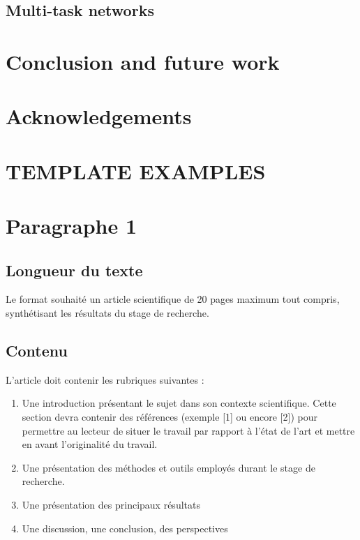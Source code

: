 \documentclass{article}
\begin{document}
\subsection*{Multi-task networks}

\section*{Conclusion and future work}

\section*{Acknowledgements}




\newpage

\section*{TEMPLATE EXAMPLES}

\section{Paragraphe 1}
\subsection{Longueur du texte}
Le format souhaité un article scientifique de 20 pages maximum tout compris, synthétisant les résultats du stage de recherche.
\subsection{Contenu}
L’article doit contenir les rubriques suivantes :
\begin{enumerate}
    \item Une introduction présentant le sujet dans son contexte scientifique. Cette section devra contenir des références (exemple [1] ou encore [2]) pour permettre au lecteur de situer le travail par rapport à l’état de l’art et mettre en avant l’originalité du travail.
    \item Une présentation des méthodes et outils employés durant le stage de recherche.
    \item Une présentation des principaux résultats
    \item Une discussion, une conclusion, des perspectives
\end{enumerate}
\end{document}
